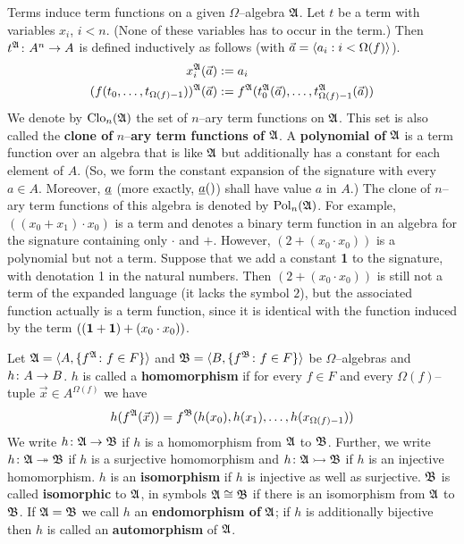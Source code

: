 Terms induce term functions on a given $\Omega$--algebra $\mathfrak{A}$.
Let $t$ be a term with variables $x_i$, $i < n$. (None of these
variables has to occur in the term.) Then $t^{\mathfrak{A}} \colon A^n \rightarrow A$ is
defined inductively as follows (with $\vec{a} = \langle a_i : i <
\Omega(f)\rangle$).
\begin{align}
x_i^{\mathfrak{A}}(\vec{a}) & := a_i \\\notag
(f(t_0, \dotsc, t_{\Omega(f)-1}))^{\mathfrak{A}}
    (\vec{a}) & := f^{\mathfrak{A}}(t_0^{\mathfrak{A}}(\vec{a}), \dotsc,
    t_{\Omega(f)-1}^{\mathfrak{A}}(\vec{a}))
\end{align}
We denote by $\operatorname{Clo}_n(\mathfrak{A})$ the set of $n$--ary term
functions on $\mathfrak{A}$. This set is also called the \textbf{clone of}
$n$--\textbf{ary term functions of} $\mathfrak{A}$. 
A \textbf{polynomial of}
$\mathfrak{A}$ is a term function over an algebra that is like $\mathfrak{A}$ but
additionally has a constant for each element of $A$. (So, we form
the constant expansion of the signature with every $a \in A$.
Moreover, $\underline{a}$ (more exactly, $\underline{a}()$) shall have value
$a$ in $A$.) The clone of $n$--ary term functions of this algebra 
is denoted by $\operatorname{Pol}_n(\mathfrak{A})$. For example, $((x_0 + x_1) 
\cdot x_0)$ is a term and
denotes a binary term function in an algebra for the signature
containing only $\cdot$ and $+$. However, $(2 + (x_0 \cdot x_0))$
is a polynomial but not a term. Suppose that we add a constant
\textbf{1} to the signature, with denotation 1 in the natural numbers.
Then $(2 + (x_0 \cdot x_0))$ is still not a term of the expanded
language (it lacks the symbol $2$), but the associated function
actually is a term function, since it is identical with the function
induced by the term $((\mbox{\bf 1}+\mbox{\bf 1}) + (x_0 \cdot x_0))$.
\begin{defn}
Let $\mathfrak{A} = \langle A, \{f^{\mathfrak{A}} \colon f \in F\}\rangle$ and
$\mathfrak{B} = \langle B, \{f^{\mathfrak{B}} \colon f \in F\}\rangle$ be $\Omega$--algebras
and $h \colon A \rightarrow B$. $h$ is called a \textbf{homomorphism}
if for every $f \in F$ and every $\Omega(f)$--tuple
$\vec{x} \in A^{\Omega(f)}$ we have
\begin{equation}
h(f^{\mathfrak{A}}(\vec{x})) = f^{\mathfrak{B}}(h(x_0), h(x_1), \dotsc, h(x_{\Omega(f)-1}))
\end{equation}
We write $h \colon \mathfrak{A} \rightarrow \mathfrak{B}$ if $h$ is a homomorphism from
$\mathfrak{A}$ to $\mathfrak{B}$. Further, we write $h \colon \mathfrak{A} \twoheadrightarrow \mathfrak{B}$ if $h$
is a surjective homomorphism and $h \colon \mathfrak{A} \rightarrowtail \mathfrak{B}$ if $h$
is an injective homomorphism. $h$ is an \textbf{isomorphism}
if $h$ is injective as well as surjective. $\mathfrak{B}$ is called
\textbf{isomorphic} to $\mathfrak{A}$, in symbols $\mathfrak{A} \cong \mathfrak{B}$ if there 
is an isomorphism from $\mathfrak{A}$ to $\mathfrak{B}$. If $\mathfrak{A} = \mathfrak{B}$
we call $h$ an \textbf{endomorphism of} $\mathfrak{A}$; if $h$ is 
additionally bijective then $h$ is called an
\textbf{automorphism} of $\mathfrak{A}$.
\end{defn}
